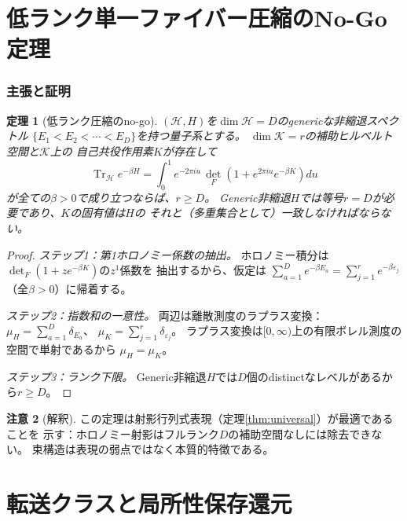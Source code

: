\documentclass[12pt]{article}
\theoremstyle{plain}
\newtheorem{theorem}{定理}[section]
\theoremstyle{definition}
\newtheorem{remark}[theorem]{注意}
\numberwithin{equation}{section}
\DeclareMathOperator{\Tr}{Tr}
\begin{document}
\part{低ランク単一ファイバー圧縮のNo-Go定理}

\section{主張と証明}\label{sec:nogo}

\begin{theorem}[低ランク圧縮のno-go]\label{thm:nogo}
$(\mathcal{H},H)$を$\dim\mathcal{H}=D$のgenericな非縮退スペクトル
$\{E_1<E_2<\cdots<E_D\}$を持つ量子系とする。
$\dim\mathcal{K}=r$の補助ヒルベルト空間と$\mathcal{K}$上の
自己共役作用素$K$が存在して
\begin{equation}
\Tr_{\mathcal{H}}e^{-\beta H}
= \int_0^1 e^{-2\pi iu}\,
\det_F\!\left(1+e^{2\pi iu}e^{-\beta K}\right)du
\end{equation}
が全ての$\beta>0$で成り立つならば、$r\geq D$。
Generic非縮退$H$では等号$r=D$が必要であり、$K$の固有値は$H$の
それと（多重集合として）一致しなければならない。
\end{theorem}

\begin{proof}
\emph{ステップ1：第1ホロノミー係数の抽出。}
ホロノミー積分は$\det_F(1+ze^{-\beta K})$の$z^1$係数を
抽出するから、仮定は
$\sum_{a=1}^D e^{-\beta E_a} = \sum_{j=1}^r e^{-\beta\varepsilon_j}$
（全$\beta>0$）に帰着する。

\emph{ステップ2：指数和の一意性。}
両辺は離散測度のラプラス変換：
$\mu_H = \sum_{a=1}^D \delta_{E_a}$、
$\mu_K = \sum_{j=1}^r \delta_{\varepsilon_j}$。
ラプラス変換は$[0,\infty)$上の有限ボレル測度の空間で単射であるから
$\mu_H=\mu_K$。

\emph{ステップ3：ランク下限。}
Generic非縮退$H$では$D$個のdistinctなレベルがあるから$r\geq D$。
\end{proof}

\begin{remark}[解釈]
この定理は射影行列式表現（定理\ref{thm:universal}）が最適であることを
示す：ホロノミー射影はフルランク$D$の補助空間なしには除去できない。
束構造は表現の弱点ではなく本質的特徴である。
\end{remark}


\part{転送クラスと局所性保存還元}
\end{document}
